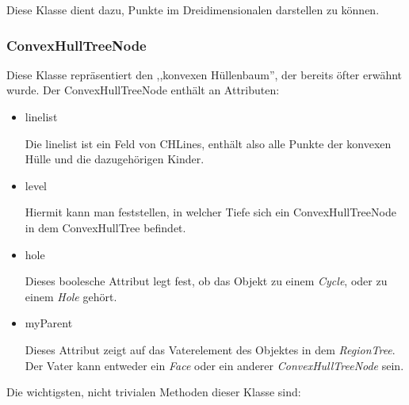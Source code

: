 Diese Klasse dient dazu, Punkte im Dreidimensionalen darstellen zu können.

\subsubsection{ConvexHullTreeNode}

Diese Klasse repräsentiert den ,,konvexen Hüllenbaum'', der bereits öfter erwähnt wurde. Der ConvexHullTreeNode enthält an Attributen:

\begin{itemize}
\item linelist

Die linelist ist ein Feld von CHLines, enthält also alle Punkte der konvexen Hülle und die dazugehörigen Kinder.

\item level

Hiermit kann man feststellen, in welcher Tiefe sich ein ConvexHullTreeNode in dem ConvexHullTree befindet.

\item hole

Dieses boolesche Attribut legt fest, ob das Objekt zu einem \textit{Cycle}, oder zu einem \textit{Hole} gehört.

\item myParent

Dieses Attribut zeigt auf das Vaterelement des Objektes in dem \textit{RegionTree}. Der Vater kann entweder ein \textit{Face} oder ein anderer \textit{ConvexHullTreeNode} sein.

\end{itemize}

Die wichtigsten, nicht trivialen Methoden dieser Klasse sind:


